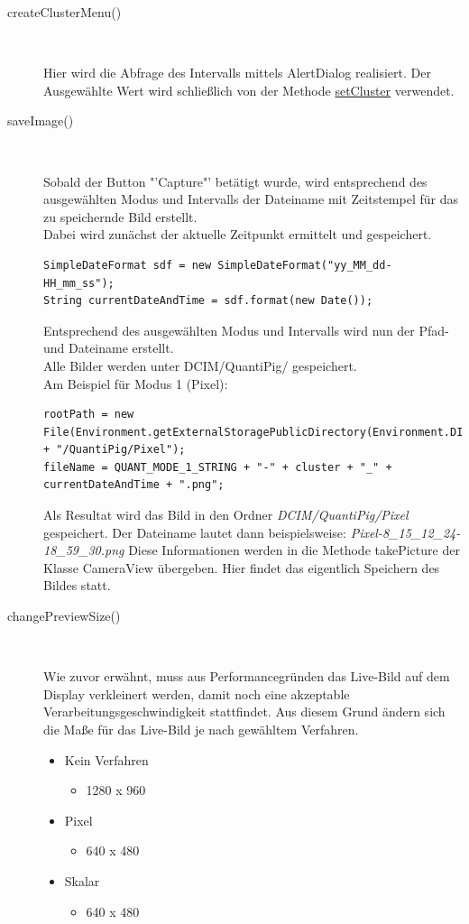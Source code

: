 \begin{description}
\item[createClusterMenu()]~\par
\label{createClusterMenu}
Hier wird die Abfrage des Intervalls mittels AlertDialog realisiert. Der Ausgewählte Wert wird schließlich von der Methode \hyperref[setCluster]{setCluster} verwendet.

\item[saveImage()]~\par
\label{saveImage}
Sobald der Button "'Capture"' betätigt wurde, wird entsprechend des ausgewählten Modus und Intervalls der Dateiname mit Zeitstempel für das zu speichernde Bild erstellt.\\
Dabei wird zunächst der aktuelle Zeitpunkt ermittelt und gespeichert. 
\begin{lstlisting}
SimpleDateFormat sdf = new SimpleDateFormat("yy_MM_dd-HH_mm_ss");
String currentDateAndTime = sdf.format(new Date());
\end{lstlisting}
Entsprechend des ausgewählten Modus und Intervalls wird nun der Pfad- und Dateiname erstellt.\\
Alle Bilder werden unter DCIM/QuantiPig/ gespeichert.\\
Am Beispiel für Modus 1 (Pixel):
\begin{lstlisting}
rootPath = new File(Environment.getExternalStoragePublicDirectory(Environment.DIRECTORY_DCIM).getPath() + "/QuantiPig/Pixel");
fileName = QUANT_MODE_1_STRING + "-" + cluster + "_" + currentDateAndTime + ".png";
\end{lstlisting}
Als Resultat wird das Bild in den Ordner \textit{DCIM/QuantiPig/Pixel} gespeichert.
Der Dateiname lautet dann beispielsweise: \textit{Pixel-8\_15\_12\_24-18\_59\_30.png}
Diese Informationen werden in die Methode takePicture der Klasse CameraView übergeben. Hier findet das eigentlich Speichern des Bildes statt.

\item[changePreviewSize()]~\par
Wie zuvor erwähnt, muss aus Performancegründen das Live-Bild auf dem Display verkleinert werden, damit noch eine akzeptable Verarbeitungsgeschwindigkeit stattfindet. Aus diesem Grund ändern sich die Maße für das Live-Bild je nach gewähltem Verfahren.
\begin{itemize}
\item Kein Verfahren
\begin{itemize}
\item 1280 x 960
\end{itemize}
\item Pixel
\begin{itemize}
\item 640 x 480
\end{itemize}
\item Skalar
\begin{itemize}
\item 640 x 480
\end{itemize}
\end{itemize}


\end{description}
